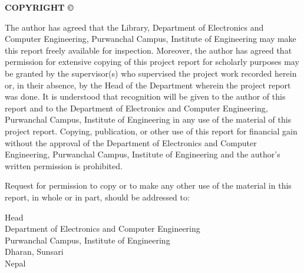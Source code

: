 \begin{center}
{\large\textbf{COPYRIGHT \copyright}}
\end{center}

\begin{flushleft}
\justifying
The author has agreed that the Library, Department of Electronics and Computer Engineering, Purwanchal Campus, Institute of Engineering may make this report freely available for inspection. Moreover, the author has agreed that permission for extensive copying of this project report for scholarly purposes may be granted by the supervisor(s) who supervised the project work recorded herein or, in their absence, by the Head of the Department wherein the project report was done. It is understood that recognition will be given to the author of this report and to the Department of Electronics and Computer Engineering, Purwanchal Campus, Institute of Engineering in any use of the material of this project report. Copying, publication, or other use of this report for financial gain without the approval of the Department of Electronics and Computer Engineering, Purwanchal Campus, Institute of Engineering and the author's written permission is prohibited.

\vspace{0.5cm}
Request for permission to copy or to make any other use of the material in this report, in whole or in part, should be addressed to:

\vspace{1.2cm}
\noindent Head\\
\noindent Department of Electronics and Computer Engineering\\
\noindent Purwanchal Campus, Institute of Engineering\\
\noindent Dharan, Sunsari\\
\noindent Nepal
\end{flushleft}
